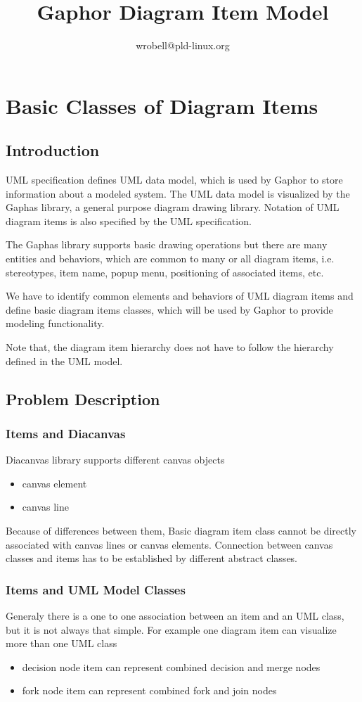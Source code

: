 \documentclass{book}
\title{Gaphor Diagram Item Model}
\author{wrobell@pld-linux.org}
\begin{document}
\maketitle

\chapter{Basic Classes of Diagram Items}
\section{Introduction}
UML specification defines UML data model, which is used by Gaphor to store
information about a modeled system. The UML data model is visualized by
the Gaphas library, a general purpose diagram drawing library. Notation
of UML diagram items is also specified by the UML specification.

The Gaphas library supports basic drawing operations but there are many
entities and behaviors, which are common to many or all diagram items, i.e.
stereotypes, item name, popup menu, positioning of associated items, etc.

We have to identify common elements and behaviors of UML diagram items
and define basic diagram items classes, which will be used
by Gaphor to provide modeling functionality.

Note that, the diagram item hierarchy does not have to follow the hierarchy
defined in the UML model. 

\section{Problem Description}

\subsection{Items and Diacanvas}\label{gaphor:basic:itemsandcanvas}
Diacanvas library supports different canvas objects
\begin{itemize}
\item canvas element
\item canvas line
\end{itemize}

Because of differences between them, Basic diagram item class cannot be
directly associated with canvas lines or canvas elements. Connection between
canvas classes and items has to be established by different abstract
classes.

\subsection{Items and UML Model Classes}
Generaly there is a one to one association between an item and an UML class,
but it is not always that simple. 
For example one diagram item can visualize more than one UML class
\begin{itemize}
\item decision node item can represent combined decision and merge nodes
\item fork node item can represent combined fork and join nodes 
\end{itemize}
\end{document}
